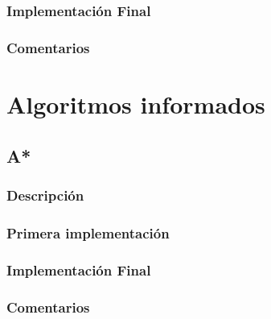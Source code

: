 \documentclass{report}
\begin{document}
        \subsection*{Implementación Final}
          \paragraph*{}{

          }
        \subsection*{Comentarios}
          \paragraph*{}{

          }
    \chapter{Algoritmos informados}
      \section{A*}
        \subsection*{Descripción}
          \paragraph*{}{

          }
        \subsection*{Primera implementación}
          \paragraph*{}{

          }
        \subsection*{Implementación Final}
          \paragraph*{}{

          }
        \subsection*{Comentarios}
          \paragraph*{}{

          }
\end{document}
